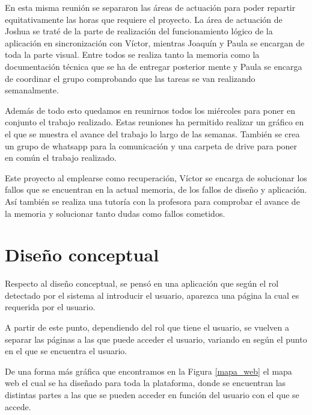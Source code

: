 \documentclass[pdftex,11pt,a4paper]{book}
\begin{document}
En esta misma reunión se separaron las áreas de actuación para poder repartir equitativamente las horas que requiere el proyecto.
La área de actuación de Joshua se traté de la parte de realización del funcionamiento lógico de la aplicación en sincronización con Víctor, mientras Joaquín y Paula se encargan de toda la parte visual. Entre todos se realiza tanto la memoria como la documentación técnica que se ha de entregar posterior mente y Paula se encarga de coordinar el grupo comprobando que las tareas se van realizando semanalmente.

Además de todo esto quedamos en reunirnos todos los miércoles para poner en conjunto el trabajo realizado. Estas reuniones ha permitido realizar un gráfico en el que se muestra el avance del trabajo lo largo de las semanas. También se crea un grupo de whatsapp para la comunicación y una carpeta de drive para poner en común el trabajo realizado.

Este proyecto al emplearse como recuperación, Víctor se encarga de solucionar los fallos que se encuentran en la actual memoria, de los fallos de diseño y aplicación. Así también se realiza una tutoría con la profesora para comprobar el avance de la memoria y solucionar tanto dudas como fallos cometidos.

\section{Diseño conceptual}

Respecto al diseño conceptual, se pensó en una aplicación que según el rol detectado por el sistema al introducir el usuario, aparezca una página la cual es requerida por el usuario.

A partir de este punto, dependiendo del rol que tiene el usuario, se vuelven a separar las páginas a las que puede acceder el usuario, variando en según el punto en el que se encuentra el usuario.

De una forma más gráfica que encontramos en la Figura \ref{mapa_web} el mapa web el cual se ha diseñado para toda la plataforma, donde se encuentran las distintas partes a las que se pueden acceder en función del usuario con el que se accede.
\end{document}
